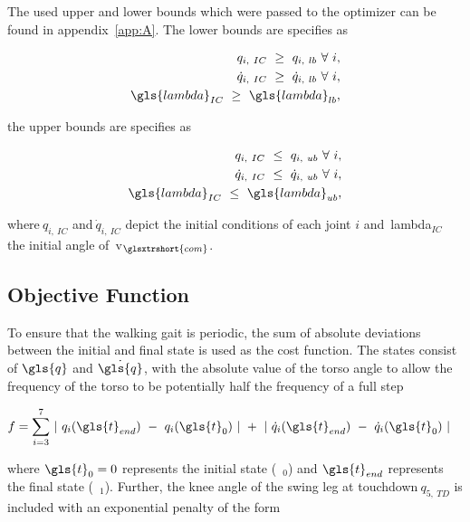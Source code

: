         The used upper and lower bounds which were passed to the optimizer can be found in appendix~\ref{app:A}. The lower bounds are specifies as

        \begin{align}
            q_{i,~IC}~\geq~q_{i,~lb}~\forall~i,             \notag \\
            \dot{q}_{i,~IC}~\geq~\dot{q}_{i,~lb}~\forall~i, \notag \\
            \gls{lambda}_{IC}~\geq~\gls{lambda}_{lb},
            \label{eq:lower-bounds}%
        \end{align}
        
        the upper bounds are specifies as

        \begin{align}
            q_{i,~IC}~\leq~q_{i,~ub}~\forall~i,             \notag \\
            \dot{q}_{i,~IC}~\leq~\dot{q}_{i,~ub}~\forall~i, \notag \\
            \gls{lambda}_{IC}~\leq~\gls{lambda}_{ub},
            \label{eq:upper-bounds}%
        \end{align}
        
        where$~q_{i,~IC}$ and$~\dot{q}_{i,~IC}$ depict the initial conditions of each joint $i$ and~\gls{lambda}$_{IC}$ the initial angle of~\gls{v}$_{\glsxtrshort{com}}$.

        \subsection*{Objective Function}
        
        To ensure that the walking gait is periodic, the sum of absolute deviations between the initial and final state is used as the cost function. The states consist of$~\gls{q}$ and$~\dot{\gls{q}}$, with the absolute value of the torso angle to allow the frequency of the torso to be potentially half the frequency of a full step

        \begin{align}
            f &= \sum_{i = 3}^{7}~\lvert~q_i(\gls{t}_{end})~-~q_i(\gls{t}_0)~\rvert~+~\lvert~\dot{q}_i(\gls{t}_{end})~-~\dot{q}_i(\gls{t}_0)~\rvert
            \label{eq:objective-function}%
        \end{align}

        where$~\gls{t}_0 = 0$ represents the initial state (\ie~$_0$) and$~\gls{t}_{end}$ represents the final state (\ie~$_1$). Further, the knee angle of the swing leg at touchdown$~q_{5,~TD}$ is included with an exponential penalty of the form 

